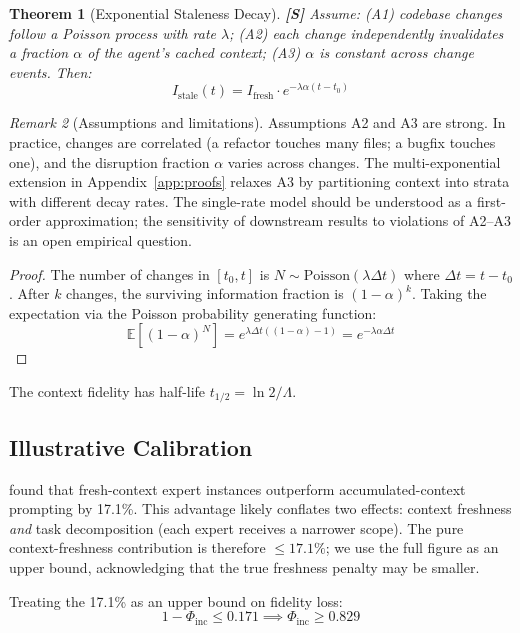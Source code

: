 \documentclass[11pt,a4paper]{article}
\newtheorem{theorem}{Theorem}[section]
\theoremstyle{definition}
\theoremstyle{remark}
\newtheorem{remark}[theorem]{Remark}
\newcommand{\E}{\mathbb{E}}
\begin{document}
\begin{theorem}[Exponential Staleness Decay]\label{thm:staleness}
\textbf{[S]} Assume: (A1) codebase changes follow a Poisson process with rate $\lambda$; (A2) each change independently invalidates a fraction $\alpha$ of the agent's cached context; (A3) $\alpha$ is constant across change events. Then:
\[
    I_{\mathrm{stale}}(t) = I_{\mathrm{fresh}} \cdot e^{-\lambda\alpha(t - t_0)}
\]
\end{theorem}

\begin{remark}[Assumptions and limitations]
Assumptions A2 and A3 are strong. In practice, changes are correlated (a refactor touches many files; a bugfix touches one), and the disruption fraction $\alpha$ varies across changes. The multi-exponential extension in Appendix~\ref{app:proofs} relaxes A3 by partitioning context into strata with different decay rates. The single-rate model should be understood as a first-order approximation; the sensitivity of downstream results to violations of A2--A3 is an open empirical question.
\end{remark}

\begin{proof}
The number of changes in $[t_0, t]$ is $N \sim \mathrm{Poisson}(\lambda\Delta t)$ where $\Delta t = t - t_0$. After $k$ changes, the surviving information fraction is $(1-\alpha)^k$. Taking the expectation via the Poisson probability generating function:
\[
    \E[(1-\alpha)^N] = e^{\lambda\Delta t((1-\alpha) - 1)} = e^{-\lambda\alpha\Delta t}
\]
\end{proof}

The context fidelity has half-life $t_{1/2} = \ln 2 / \Lambda$.

\subsection{Illustrative Calibration}

\citet{suzgun2024metaprompting} found that fresh-context expert instances outperform accumulated-context prompting by 17.1\%. This advantage likely conflates two effects: context freshness \emph{and} task decomposition (each expert receives a narrower scope). The pure context-freshness contribution is therefore $\leq 17.1\%$; we use the full figure as an upper bound, acknowledging that the true freshness penalty may be smaller.

Treating the 17.1\% as an upper bound on fidelity loss:
\[
    1 - \Phi_{\mathrm{inc}} \leq 0.171 \implies \Phi_{\mathrm{inc}} \geq 0.829
\]
\end{document}
